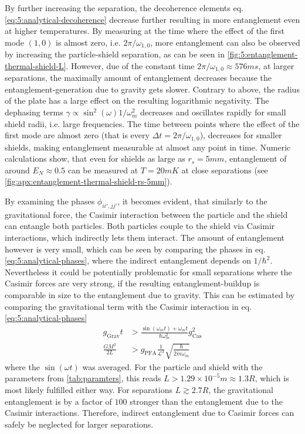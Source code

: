 By further increasing the separation, the decoherence elements eq. \eqref{eq:5:analytical-decoherence} decrease further resulting in more entanglement even at higher temperatures.
By measuring at the time where the effect of the first mode $(1,0)$ is almost zero, i.e. $2\pi/\omega_{1,0}$, more entanglement can also be observed by increasing the particle-shield separation, as can be seen in \cref{fig:5:entanglement-thermal-shield-L}. However, due of the constant time $2\pi/\omega_{1,0} \approx 576\si{ms}$, at larger separations, the maximally amount of entanglement decreases because the entanglement-generation due to gravity gets slower.
Contrary to above, the radius of the plate has a large effect on the resulting logarithmic negativity. 
The dephasing terms $\gamma \propto \sin^2(\omega) 1/\omega_m^2$ decreases and oscillates rapidly for small shield radii, i.e. large frequencies.
The time between points where the effect of the first mode are almost zero (that is every $\Delta t = 2\pi/\omega_{1,0}$), decreases for smaller shields, making entanglement measurable at almost any point in time.
Numeric calculations show, that even for shields as large as $r_s = 5\si{mm}$, entanglement of around $E_N \approx 0.5$ can be measured at $T = 20\si{mK}$ at close separations (see \cref{fig:apx:entanglement-thermal-shield-rs-5mm}). 

By examining the phases $\phi_{ii',jj'}$, it becomes evident, that similarly to the gravitational force, the Casimir interaction between the particle and the shield can entangle both particles.
Both particles couple to the shield via Casimir interactions, which indirectly lets them interact.
The amount of entanglement however is very small, which can be seen by comparing the phases in eq. \eqref{eq:5:analytical-phases}, where the indirect entanglement depends on $1/\hbar^2$.
Nevertheless it could be potentially problematic for small separations where the Casimir forces are very strong, if the resulting entanglement-buildup is comparable in size to the entanglement due to gravity.
This can be estimated by comparing the gravitational term with the Casimir interaction in eq. \eqref{eq:5:analytical-phases}
\begin{align}
  g_\mathrm{Grav} t &> \frac{\sin(\omega_m t) + \omega_m t}{\hbar \omega_m^2} g_\mathrm{Cas}^2 \\
  \frac{G M^2}{2L} &> g_\mathrm{PFA} \frac{1}{\mathscr{L}^3} \sqrt{\frac{\hbar}{2\tilde{m}\omega_m}}
\end{align}
where the $\sin(\omega t)$ was averaged. For the particle and shield with the parameters from \cref{tab:paramters}, this reads $L > 1.29\times 10^{-5}\si{m}\approx 1.3 R$, which is most likely fulfilled either way.
For separations $L \gtrsim 2.7R$, the gravitational entanglement is by a factor of $100$ stronger than the entanglement due to the Casimir interactions.
Therefore, indirect entanglement due to Casimir forces can safely be neglected for larger separations.



